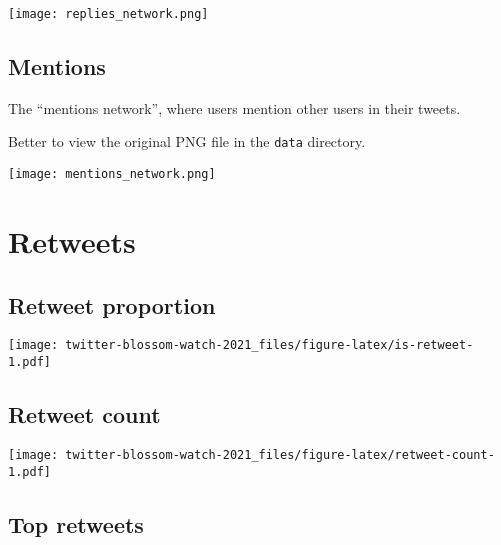 \documentclass[
]{article}
\begin{document}
\texttt{[image: replies\_network.png]}

\hypertarget{mentions}{%
\subsection{Mentions}\label{mentions}}

The ``mentions network'', where users mention other users in their
tweets.

Better to view the original PNG file in the \texttt{data} directory.

\texttt{[image: mentions\_network.png]}

\hypertarget{retweets}{%
\section{Retweets}\label{retweets}}

\hypertarget{retweet-proportion}{%
\subsection{Retweet proportion}\label{retweet-proportion}}

\texttt{[image: twitter-blossom-watch-2021\_files/figure-latex/is-retweet-1.pdf]}

\hypertarget{retweet-count}{%
\subsection{Retweet count}\label{retweet-count}}

\texttt{[image: twitter-blossom-watch-2021\_files/figure-latex/retweet-count-1.pdf]}

\hypertarget{top-retweets}{%
\subsection{Top retweets}\label{top-retweets}}
\end{document}
